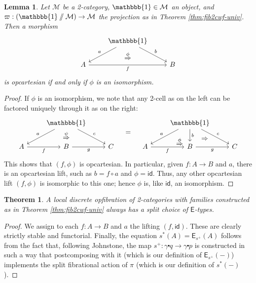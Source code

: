 \documentclass[10pt]{article}
\newtheorem{theorem}{Theorem}
\newtheorem{lemma}{Lemma}
\theoremstyle{definition}
\newcommand{\id}{\mathsf{id}}
\newcommand\Esym{\ensuremath{\mathsf{E}}}
\newcommand\E[2]{\ensuremath{\mathsf{E}_{#1}(#2)}}
\newcommand\St[2]{\ensuremath{{#1}^*(#2)}}
\newcommand\TrPlusSym[1]{\ensuremath{{#1}^+}}
\newcommand\M{\mathcal{M}}
\newcommand\vp{\varpi}
\newcommand\one{\mathbbb{1}}
\newcommand\ce{\mathord{\centerdot}}
\let\lslice\sslash
\begin{document}
\begin{lemma}
  Let $\M$ be a 2-category, $\one\in\M$ an object, and $\vp : (\one\lslice\M) \to \M$ the projection as in Theorem \ref{thm:fib2cwf-univ}.
  Then a morphism
  \begin{equation}
    \begin{tikzcd}
      & \one \ar[dl,"a"'] \ar[dr,"b"] \ar[d,phantom,"\overset{\phi}{\Rightarrow}"] \\
      A \ar[rr,"f"'] & {}& B
    \end{tikzcd}
  \end{equation}
  is opcartesian if and only if $\phi$ is an isomorphism.
\end{lemma}
\begin{proof}
  If $\phi$ is an isomorphism, we note that any 2-cell as on the left can be factored uniquely through it as on the right:
  \begin{equation}
    \begin{tikzcd}
      & \one \ar[dl,"a"'] \ar[dr,"c"] \ar[d,phantom,"\overset{\psi}{\Rightarrow}"] \\
      A \ar[r,"f"'] & B \ar[r,"g"'] & C
    \end{tikzcd}
    \quad = \quad
    \begin{tikzcd}
      {} \ar[dr,phantom,very near end,"\overset{\phi}{\Rightarrow}"] & \one \ar[dl,"a"'] \ar[d,"b"] \ar[dr,"c"] & {} \ar[dl,phantom,near end,"\Rightarrow"] \\
      A \ar[r,"f"'] & B \ar[r,"g"'] & C
    \end{tikzcd}
  \end{equation}
  This shows that $(f,\phi)$ is opcartesian.
  In particular, given $f:A\to B$ and $a$, there is an opcartesian lift, such as $b=f\circ a$ and $\phi=\id$.
  Thus, any other opcartesian lift $(f,\phi)$ is isomorphic to this one; hence $\phi$ is, like $\id$, an isomorphism.
\end{proof}

\begin{theorem}
  A local discrete opfibration of 2-categories with families constructed as in Theorem \ref{thm:fib2cwf-univ} always has a split choice of $\Esym$-types.
\end{theorem}
\begin{proof}
  We assign to each $f:A\to B$ and $a$ the lifting $(f,\id)$.
  These are clearly strictly stable and functorial.
  Finally, the equation $\St{s}{A}=\E{\TrPlusSym{s}}{A}$ follows from the fact that, following Johnstone, the map $\TrPlusSym{s}:\gamma\ce q \to \gamma\ce p$ is constructed in such a way that postcomposing with it (which is our definition of $\E{\TrPlusSym{s}}{-}$) implements the split fibrational action of $\pi$ (which is our definition of $\St{s}{-}$).
\end{proof}
\end{document}
